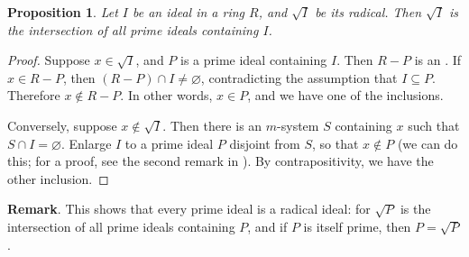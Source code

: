 \documentclass[12pt]{article}
\newtheorem{prop}{Proposition}
\begin{document}
\begin{prop} Let $I$ be an ideal in a ring $R$, and $\sqrt{I}$ be its radical.  Then $\sqrt{I}$ is the intersection of all prime ideals containing $I$. \end{prop}

\begin{proof}  Suppose $x\in \sqrt{I}$, and $P$ is a prime ideal containing $I$.  Then $R-P$ is an .  If $x\in R-P$, then $(R-P)\cap I\ne \varnothing$, contradicting the assumption that $I\subseteq P$.  Therefore $x\notin R-P$.  In other words, $x\in P$, and we have one of the inclusions.

Conversely, suppose $x\notin \sqrt{I}$.  Then there is an $m$-system $S$ containing $x$ such that $S\cap I=\varnothing$.  Enlarge $I$ to a prime ideal $P$ disjoint from $S$, so that $x\notin P$ (we can do this; for a proof, see the second remark in ).  By contrapositivity, we have the other inclusion.
\end{proof}

\textbf{Remark}.  This shows that every prime ideal is a radical ideal: for $\sqrt{P}$ is the intersection of all prime ideals containing $P$, and if $P$ is itself prime, then $P=\sqrt{P}$.
\end{document}
